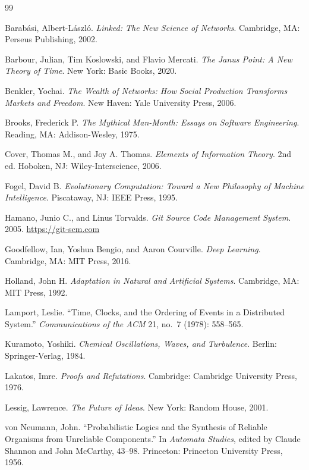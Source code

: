 \documentclass[11pt]{article}
\begin{document}
\begin{thebibliography}{99}

Barab\'asi, Albert-L\'aszl\'o.
\textit{Linked: The New Science of Networks}.
Cambridge, MA\@: Perseus Publishing, 2002.

Barbour, Julian, Tim Koslowski, and Flavio Mercati.
\textit{The Janus Point: A New Theory of Time}.
New York: Basic Books, 2020.

Benkler, Yochai.
\textit{The Wealth of Networks: How Social Production Transforms Markets and Freedom}.
New Haven: Yale University Press, 2006.

Brooks, Frederick P.
\textit{The Mythical Man-Month: Essays on Software Engineering}.
Reading, MA\@: Addison-Wesley, 1975.

Cover, Thomas M., and Joy A. Thomas.
\textit{Elements of Information Theory}.
2nd ed.
Hoboken, NJ\@: Wiley-Interscience, 2006.

Fogel, David B.
\textit{Evolutionary Computation: Toward a New Philosophy of Machine Intelligence}.
Piscataway, NJ\@: IEEE Press, 1995.

Hamano, Junio C., and Linus Torvalds.
\textit{Git Source Code Management System}.
2005.
\url{https://git-scm.com}

Goodfellow, Ian, Yoshua Bengio, and Aaron Courville.
\textit{Deep Learning}.
Cambridge, MA\@: MIT Press, 2016.

Holland, John H.
\textit{Adaptation in Natural and Artificial Systems}.
Cambridge, MA\@: MIT Press, 1992.

Lamport, Leslie.
``Time, Clocks, and the Ordering of Events in a Distributed System.''
\textit{Communications of the ACM} 21, no.~7 (1978): 558--565.

Kuramoto, Yoshiki.
\textit{Chemical Oscillations, Waves, and Turbulence}.
Berlin: Springer-Verlag, 1984.

Lakatos, Imre.
\textit{Proofs and Refutations}.
Cambridge: Cambridge University Press, 1976.

Lessig, Lawrence.
\textit{The Future of Ideas}.
New York: Random House, 2001.

von Neumann, John.
``Probabilistic Logics and the Synthesis of Reliable Organisms from Unreliable
Components.''
In \textit{Automata Studies}, edited by Claude Shannon and John McCarthy,
43--98.
Princeton: Princeton University Press, 1956.


\end{thebibliography}
\end{document}
